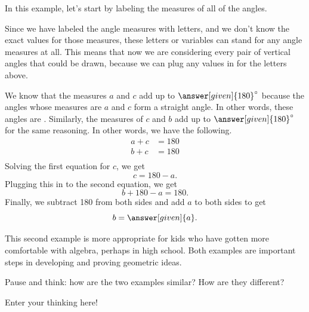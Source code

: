 \documentclass{ximera}
\begin{document}
\begin{example}
In this example, let's start by labeling the measures of all of the angles.
\begin{image}
\end{image}
Since we have labeled the angle measures with letters, and we don't know the exact values for those measures, these letters or variables can stand for any angle measures at all. This means that now we are considering every pair of vertical angles that could be drawn, because we can plug any values in for the letters above.

We know that the measures $a$ and $c$ add up to $\answer[given]{180}^{\circ}$ because the angles whose measures are $a$ and $c$ form a straight angle. In other words, these angles are . Similarly, the measures of $c$ and $b$ add up to $\answer[given]{180}^{\circ}$ for the same reasoning. In other words, we have the following.
\begin{align}
a + c &= 180 \\
b + c &= 180 \\
\end{align}
Solving the first equation for $c$, we get \[c = 180-a. \] Plugging this in to the second equation, we get \[b + 180 - a = 180.\] Finally, we subtract 180 from both sides and add $a$ to both sides to get \[ b = \answer[given]{a}.\]

\end{example}

This second example is more appropriate for kids who have gotten more comfortable with algebra, perhaps in high school. Both examples are important steps in developing and proving geometric ideas.

\begin{question}
Pause and think: how are the two examples similar? How are they different?
\begin{freeResponse} Enter your thinking here! \end{freeResponse}
\end{question}
\end{document}
